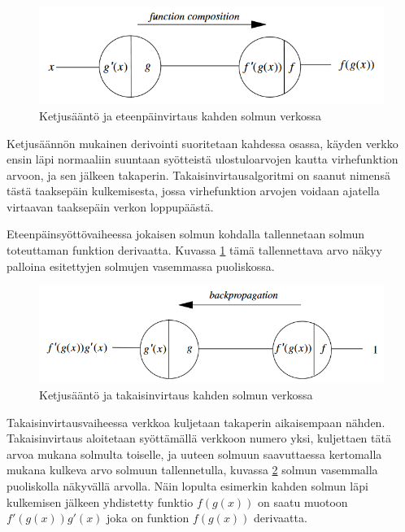 \documentclass[finnish]{tktltiki2}
\theoremstyle{definition}
\theoremstyle{remark}
\begin{document}
  \begin{figure}[h]
    \label{pic:composition}
    \centering
    \includegraphics[scale=0.5]{function-composition}
    \caption{Ketjusääntö ja eteenpäinvirtaus kahden solmun verkossa \cite{Rojas96}}
  \end{figure}

  Ketjusäännön mukainen derivointi suoritetaan kahdessa osassa, käyden verkko ensin läpi normaaliin suuntaan syötteistä ulostuloarvojen kautta virhefunktion arvoon, ja sen jälkeen takaperin. Takaisinvirtausalgoritmi on saanut nimensä tästä taaksepäin kulkemisesta, jossa virhefunktion arvojen voidaan ajatella virtaavan taaksepäin verkon loppupäästä.
  
  Eteenpäinsyöttövaiheessa jokaisen solmun kohdalla tallennetaan solmun toteuttaman funktion derivaatta. Kuvassa \ref{pic:composition} tämä tallennettava arvo näkyy palloina esitettyjen solmujen vasemmassa puoliskossa.

  \begin{figure}[h]
    \label{pic:backpropagation}
    \centering
    \includegraphics[scale=0.5]{backpropagation}
    \caption{Ketjusääntö ja takaisinvirtaus kahden solmun verkossa \cite{Rojas96}}
  \end{figure}

  Takaisinvirtausvaiheessa verkkoa kuljetaan takaperin aikaisempaan nähden. Takaisinvirtaus aloitetaan syöttämällä verkkoon numero yksi, kuljettaen tätä arvoa mukana solmulta toiselle, ja uuteen solmuun saavuttaessa kertomalla mukana kulkeva arvo solmuun tallennetulla, kuvassa \ref{pic:backpropagation} solmun vasemmalla puoliskolla näkyvällä arvolla. Näin lopulta esimerkin kahden solmun läpi kulkemisen jälkeen yhdistetty funktio $f(g(x))$ on saatu muotoon $f'(g(x))g'(x)$ joka on funktion $f(g(x))$ derivaatta. 
\end{document}
